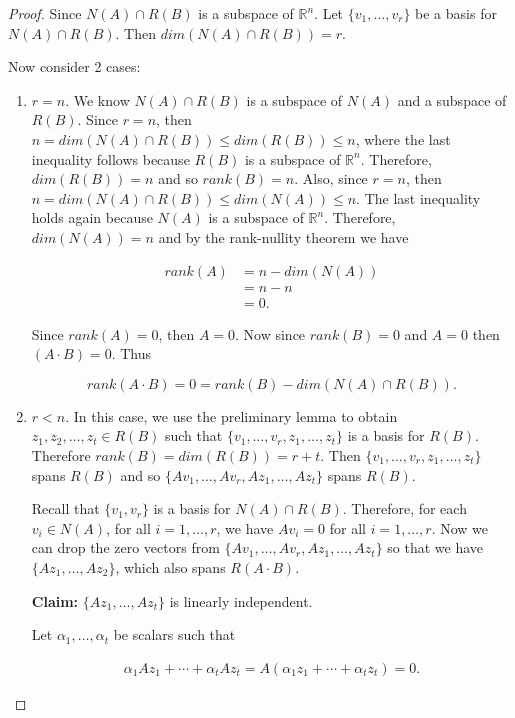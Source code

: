 \documentclass[12pt]{article}
\theoremstyle{definition}
\begin{document}
\begin{proof}
Since $N(A) \cap R(B)$ is a subspace of $\mathbb{R}^n$. Let $\{v_1, \ldots, v_r \}$ be a basis for
$N(A) \cap R(B)$. Then $dim(N(A) \cap R(B)) = r$.

\vspace{0.1cm}

Now consider 2 cases:
\begin{enumerate}[label = (\arabic*)]
\item $r = n$. We know $N(A) \cap R(B)$ is a subspace of $N(A)$ and a subspace of $R(B)$.
Since $r = n$, then $n = dim(N(A) \cap R(B)) \leq dim(R(B)) \leq n$, where the last
inequality follows because $R(B)$ is a subspace of $\mathbb{R}^n$. Therefore,
$dim(R(B)) = n$ and so $rank(B) = n$. Also, since
$r = n$, then $n = dim(N(A) \cap R(B)) \leq dim(N(A)) \leq n$. The last inequality
holds again because $N(A)$ is a subspace of $\mathbb{R}^n$. Therefore, $dim(N(A)) = n$
and by the rank-nullity theorem we have

\begin{align*}
rank(A) &= n - dim(N(A)) \\
&= n - n \\
&= 0.
\end{align*}

Since $rank(A) = 0$, then $A = 0$. Now since $rank(B) = 0$ and $A = 0$ then $(A \cdot B) = 0$.
Thus

\[ rank(A \cdot B) = 0 = rank(B) - dim(N(A) \cap R(B)). \]


\item $r < n$. In this case, we use the preliminary lemma to obtain
$z_1, z_2, \ldots, z_t \in R(B)$ such that
$\{ v_1, \ldots, v_r, z_1, \ldots, z_t \}$ is a basis for $R(B)$. Therefore
$rank(B) = dim(R(B)) = r + t$. Then $\{ v_1, \ldots, v_r, z_1, \ldots, z_t \}$
spans $R(B)$ and so 
$\{ Av_1, \ldots, Av_r, Az_1, \ldots, Az_t \}$ spans $R(B)$.

Recall that $\{v_1, v_r\}$ is a basis for $N(A) \cap R(B)$. Therefore, for each
$v_i \in N(A)$, for all $i = 1, \ldots, r$, we have $Av_i = 0$ for all $i = 1, \ldots, r$.
Now we can drop the zero vectors from $\{ Av_1, \ldots, Av_r, Az_1, \ldots, Az_t \}$
so that we have $\{Az_1, \ldots, Az_2\}$, which also spans $R(A \cdot B)$.

\textbf{Claim:} $\{Az_1, \ldots, Az_t\}$ is linearly independent.

Let $\alpha_1, \ldots, \alpha_t$ be scalars such that

\begin{align*}
\alpha_1 A z_1 + \cdots + \alpha_t A z_t = A (\alpha_1z_1 + \cdots + \alpha_t z_t) = 0.
\end{align*}


\end{enumerate}
\end{proof}
\end{document}
